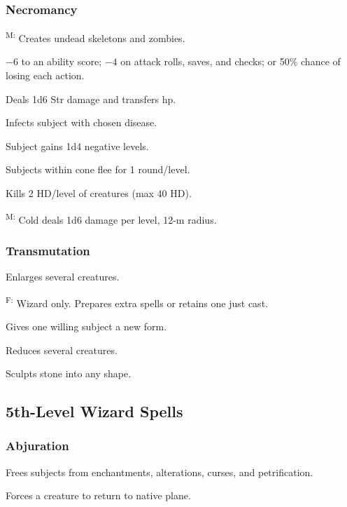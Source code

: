 \subsubsection{Necromancy}
	\textsuperscript{M:} Creates undead skeletons and zombies.

	 $-6$ to an ability score; $-4$ on attack rolls, saves, and checks; or 50\% chance of losing each action.

	 Deals 1d6 Str damage and transfers hp. %

	 Infects subject with chosen disease.

	 Subject gains 1d4 negative levels.

	 Subjects within cone flee for 1 round/level.

	 Kills 2 HD/level of creatures (max 40 HD). %

	\textsuperscript{M:} Cold deals 1d6 damage per level, 12-m radius. %

\subsubsection{Transmutation}
	 Enlarges several creatures.

	\textsuperscript{F:} Wizard only. Prepares extra spells or retains one just cast.

	 Gives one willing subject a new form.

	 Reduces several creatures.

	 Sculpts stone into any shape.



\subsection{5th-Level Wizard Spells}

\subsubsection{Abjuration}
	 Frees subjects from enchantments, alterations, curses, and petrification.

	 Forces a creature to return to native plane.

